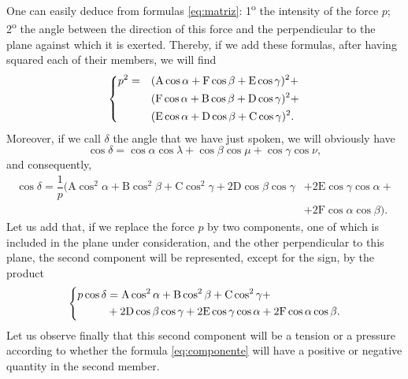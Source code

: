 \documentclass[leqno,openright,smallroyalvopaper,8pt,twoside,showtrims]{memoir}
\begin{document}
One can easily deduce from formulas \eqref{eq:matriz}:  1\textsuperscript{o} the intensity of the force $p$; 2\textsuperscript{o} the angle between the direction of this force and the perpendicular to the plane against which it is exerted. Thereby, if we add these formulas, after having squared each of their members, we will find
\begin{align}\label{eq:p2}
\begin{dcases}
p^2 = &(\text{A}\cos\alpha+\text{F}\cos\beta+\text{E}\cos\gamma)^2+\\
&(\text{F}\cos\alpha+\text{B}\cos\beta+\text{D}\cos\gamma)^2+\\
&(\text{E}\cos\alpha+\text{D}\cos\beta+\text{C}\cos\gamma)^2.
\end{dcases}
\end{align}
Moreover, if we call $\delta$ the angle that we have just spoken, we will obviously have
\begin{equation}
\cos\delta = \cos\alpha\cos\lambda + \cos\beta\cos\mu+\cos\gamma\cos\nu,
\end{equation}
and consequently,
\begin{align}
\cos\delta = \dfrac{1}{p}(\text{A}\cos^2\alpha+\text{B}\cos^2\beta+\text{C}\cos^2\gamma+2\text{D}\cos\beta\cos\gamma &+2\text{E}\cos\gamma\cos\alpha+\\
&+2\text{F}\cos\alpha\cos\beta).\nonumber
\end{align}
Let us add that, if we replace the force $p$ by two components, one of which is included in the plane under consideration, and the other perpendicular to this plane, the second component will be represented, except for the sign, by the product
\begin{equation}\label{eq:componente}
\begin{dcases}
\begin{aligned}
p\cos\delta &= \text{A}\cos^2\alpha+\text{B}\cos^2\beta+\text{C}\cos^2\gamma+\\
&+2\text{D}\cos\beta\cos\gamma +2\text{E}\cos\gamma\cos\alpha+2\text{F}\cos\alpha\cos\beta.
\end{aligned}
\end{dcases}
\end{equation}
Let us observe finally that this second component will be a tension or a pressure according to whether the formula \eqref{eq:componente} will have a positive or negative quantity in the second member.
\end{document}
